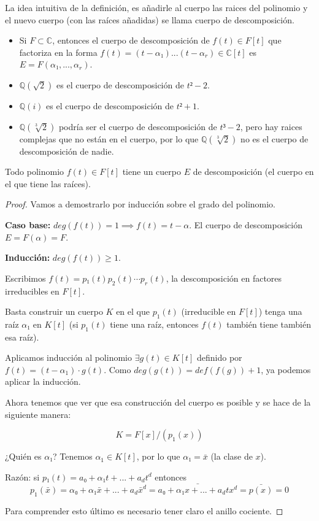 \documentclass{apuntes}
\begin{document}
La idea intuitiva de la definición, es añadirle al cuerpo las raices del polinomio y el nuevo cuerpo (con las raíces añadidas) se llama cuerpo de descomposición.

\begin{example}
\begin{itemize}

\item Si $F\subset ℂ$, entonces el cuerpo de descomposición de $f(t) ∈F[t]$ que factoriza en la forma $f(t) = (t-α₁) ... (t-α_r) ∈ℂ[t]$ es $E=F(α₁,...,α_r)$.

\item $ℚ(\sqrt{2})$ es el cuerpo de descomposición de $t²-2$.

\item $ℚ(i)$ es el cuerpo de descomposición de $t²+1$.

\item $ℚ(\sqrt[3]{2})$ podría ser el cuerpo de descomposición de $t³-2$, pero hay raices complejas que no están en el cuerpo, por lo que $ℚ(\sqrt[3]{2})$ no es el cuerpo de descomposición de nadie.
\end{itemize}
\end{example}

\begin{prop}
Todo polinomio $f(t) ∈ F[t]$ tiene un cuerpo $E$ de descomposición (el cuerpo en el que tiene las raíces).
\end{prop}


\begin{proof}
Vamos a demostrarlo por inducción sobre el grado del polinomio.

\textbf{Caso base: } $deg(f(t)) = 1 \implies f(t) = t-α$.  El cuerpo de descomposición $E = F(α) = F$.

\textbf{Inducción: } $deg(f(t)) ≥1$.

Escribimos $f(t) = p₁(t)p_2(t)\cdots p_r(t)$, la descomposición en factores irreducibles en $F[t]$.

Basta construir un cuerpo $K$ en el que $p_1(t)$ (irreducible en $F[t]$) tenga una raíz $α₁$  en $K[t]$ (si $p_1(t)$ tiene una raíz, entonces $f(t)$ también tiene también esa raíz).

Aplicamos inducción al polinomio $\exists g(t)∈K[t]$ definido por $f(t) = (t-α_1) \cdot g(t)$. Como $deg(g(t)) = def(f(g)) + 1$, ya podemos aplicar la inducción.

Ahora tenemos que ver que esa construcción del cuerpo es posible y se hace de la siguiente manera:

$$K = F[x]/(p_1(x))$$

¿Quién es $α₁$? Tenemos $α_1 ∈K[t]$, por lo que $α₁ = \bar{x}$ (la clase de $x$).

Razón: si $p₁(t) = a₀ + α₁t+ ...+a_dt^d$ entonces
$$p_1(\bar{x}) = α₀+α₁\bar{x} + ... + a_d\bar{x}^d = \bar{a₀ + α₁x+ ... + a_dtx^d} = \bar{p(x)} = 0$$


Para comprender esto último es necesario tener claro el anillo cociente.
\end{proof}
\end{document}
